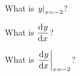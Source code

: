 \begin{ProblemSet}[pencil space=2in]

 \begin{Problem}[pencil space=1in]
  What is $\displaystyle{\left.y\right|_{x=-2}}$?
 \end{Problem}

 \begin{Problem}
  What is $\displaystyle{\frac{\mathrm{d}^{{}}y}{\mathrm{d}x^{{}}}}$?
 \end{Problem}

 \begin{Problem}
  What is $\displaystyle{\left.\frac{\mathrm{d}^{{}}y}{\mathrm{d}x^{{}}}\right|_{x=-2}}$?
 \end{Problem}

\end{ProblemSet}

